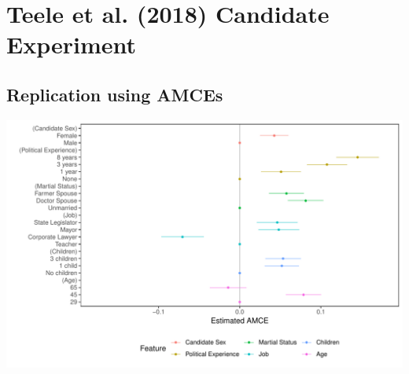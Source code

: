 \documentclass[a4paper,12pt]{article}\usepackage[]{graphicx}\usepackage[]{color}
\makeatletter
\def\maxwidth{ %
  \ifdim\Gin@nat@width>\linewidth
    \linewidth
  \else
    \Gin@nat@width
  \fi
}
\newenvironment{knitrout}{}{} %
\makeatother
\begin{document}
\clearpage


\section{Teele et al. (2018) Candidate Experiment}

\subsection{Replication using AMCEs}

\begin{knitrout}
\color{fgcolor}
\includegraphics[width=\maxwidth]{figure/tkr_amce_appendix-1} 

\end{knitrout}

\clearpage
\end{document}

